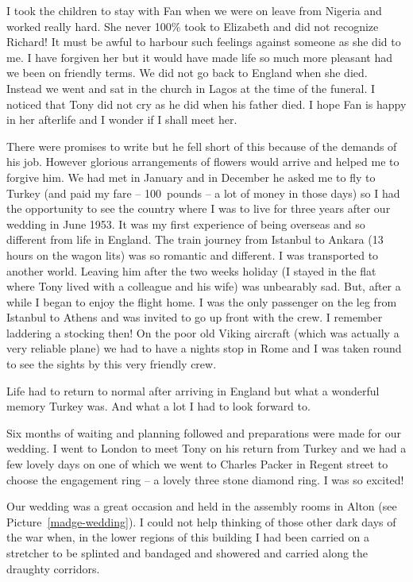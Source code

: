 I took the children to stay with Fan when we were on leave from
Nigeria and worked really hard. She never 100\% took to Elizabeth and
did not recognize Richard! It must be awful to harbour such feelings
against someone as she did to me. I have forgiven her but it would
have made life so much more pleasant had we been on friendly terms. We
did not go back to England when she died. Instead we went and sat in
the church in Lagos at the time of the funeral. I noticed that Tony
did not cry as he did when his father died. I hope Fan is happy in her
afterlife and I wonder if I shall meet her.

There were promises to write but he fell short of this because of the
demands of his job. However glorious arrangements of flowers would
arrive and helped me to forgive him. We had met in January and in
December he asked me to fly to Turkey (and paid my fare -- 100~pounds
-- a lot of money in those days) so I had the opportunity to see the
country where I was to live for three years after our wedding in June
1953. It was my first experience of being overseas and so different
from life in England. The train journey from Istanbul to Ankara (13
hours on the wagon lits) was so romantic and different. I was
transported to another world. Leaving him after the two weeks holiday
(I stayed in the flat where Tony lived with a colleague and his wife)
was unbearably sad. But, after a while I began to enjoy the flight
home. I was the only passenger on the leg from Istanbul to Athens and
was invited to go up front with the crew. I remember laddering a
stocking then! On the poor old Viking aircraft (which was actually a
very reliable plane) we had to have a nights stop in Rome and I was
taken round to see the sights by this very friendly crew.

Life had to return to normal after arriving in England but what a
wonderful memory Turkey was. And what a lot I had to look forward to.

Six months of waiting and planning followed and preparations were made
for our wedding. I went to London to meet Tony on his return from
Turkey and we had a few lovely days on one of which we went to Charles
Packer in Regent street to choose the engagement ring -- a lovely
three stone diamond ring. I was so excited!

Our wedding was a great occasion and held in the assembly rooms in
Alton (see Picture~\ref{madge-wedding}). I could not help thinking of
those other dark days of the war when, in the lower regions of this
building I had been carried on a stretcher to be splinted and bandaged
and showered and carried along the draughty corridors.

